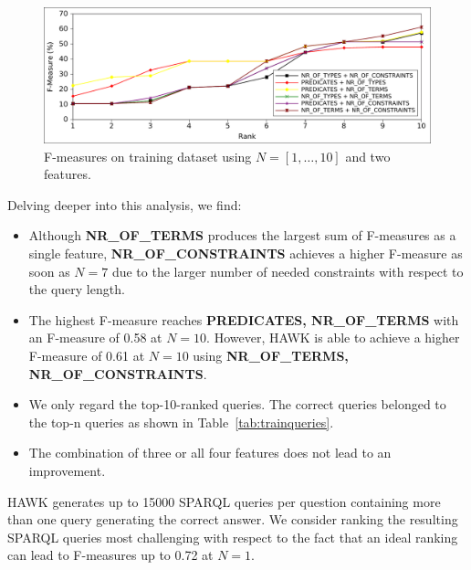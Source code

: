 \begin{figure}[htb!]
\includegraphics[width=\linewidth]{part_03/ESWC_HAWK/twofeature}
\caption{F-measures on training dataset using $N=[1,\ldots,10]$ and two features.}
\label{chahawk:fig:ranking_2}
\end{figure}



Delving deeper into this analysis, we find:
\begin{itemize}
\item Although \textbf{NR\_OF\_TERMS} produces the largest sum of F-measures as a single feature, \textbf{NR\_OF\_CONSTRAINTS} achieves a higher F-measure as soon as $N=7$ due to the larger number of needed constraints with respect to the query length.
\item The highest F-measure reaches \textbf{PREDICATES, NR\_OF\_TERMS} with an F-measure of 0.58 at $N=10$. However, HAWK is able to achieve a higher F-measure of 0.61 at $N=10$ using \textbf{NR\_OF\_TERMS, NR\_OF\_CONSTRAINTS}.
\item We only regard the top-10-ranked queries. The correct queries belonged to the top-n queries as shown in Table~\ref{tab:trainqueries}.
\item The combination of three or all four features does not lead to an improvement. %
\end{itemize}

HAWK generates up to 15000 SPARQL queries per question containing more than one query generating the correct answer. 
We consider ranking the resulting SPARQL queries most challenging with respect to the fact that an ideal ranking can lead to F-measures up to 0.72 at $N=1$.

